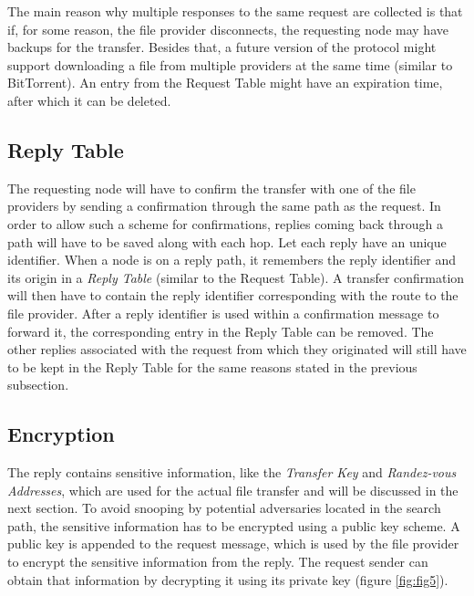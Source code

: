 The main reason why multiple responses to the same request are collected is 
that if, for some reason, the file provider disconnects, the requesting node 
may have backups for the transfer. Besides that, a future version of the 
protocol might support downloading a file from multiple providers at the same 
time (similar to BitTorrent). An entry from the Request Table might have an 
expiration time, after which it can be deleted.

\subsection{Reply Table}

The requesting node will have to confirm the transfer with one of the file 
providers by sending a confirmation through the same path as the request. In 
order to allow such a scheme for confirmations, replies coming back through a 
path will have to be saved along with each hop. Let each reply have an unique 
identifier. When a node is on a reply path, it remembers the reply identifier 
and its origin in a \textit{Reply Table} (similar to the Request Table). A 
transfer confirmation will then have to contain the reply identifier 
corresponding with the route to the file provider. After a reply identifier is 
used within a confirmation message to forward it, the corresponding entry in 
the Reply Table can be removed. The other replies associated with the request 
from which they originated will still have to be kept in the Reply Table for 
the same reasons stated in the previous subsection.

\subsection{Encryption}

The reply contains sensitive information, like the \textit{Transfer Key} and 
\textit{Randez-vous Addresses}, which are used for the actual file transfer and 
will be discussed in the next section. To avoid snooping by potential 
adversaries located in the search path, the sensitive information has to be 
encrypted using a public key scheme. A public key is appended to the request 
message, which is used by the file provider to encrypt the sensitive 
information from the reply. The request sender can obtain that information by 
decrypting it using its private key (figure \ref{fig:fig5}).

